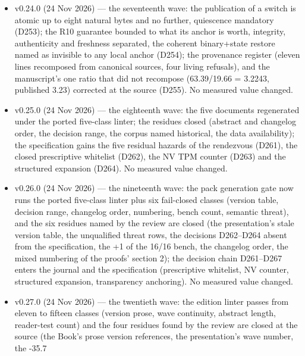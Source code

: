 \documentclass[10pt,a4paper]{article}
\begin{document}
\begin{itemize}
\item v0.24.0 (24 Nov 2026) --- the seventeenth wave: the publication of a switch is atomic up to eight natural bytes and no further, quiescence mandatory (D253); the R10 guarantee bounded to what its anchor is worth, integrity, authenticity and freshness separated, the coherent binary+state restore named as invisible to any local anchor (D254); the provenance register (eleven lines recomposed from canonical sources, four living refusals), and the manuscript's one ratio that did not recompose (63.39/19.66 = 3.2243, published 3.23) corrected at the source (D255). No measured value changed.
\item v0.25.0 (24 Nov 2026) --- the eighteenth wave: the five documents regenerated under the ported five-class linter; the residues closed (abstract and changelog order, the decision range, the corpus named historical, the data availability); the specification gains the five residual hazards of the rendezvous (D261), the closed prescriptive whitelist (D262), the NV TPM counter (D263) and the structured expansion (D264). No measured value changed.
\item v0.26.0 (24 Nov 2026) --- the nineteenth wave: the pack generation gate now runs the ported five-class linter plus six fail-closed classes (version table, decision range, changelog order, numbering, bench count, semantic threat), and the six residues named by the review are closed (the presentation's stale version table, the unqualified threat rows, the decisions D262--D264 absent from the specification, the +1 of the 16/16 bench, the changelog order, the mixed numbering of the proofs' section 2); the decision chain D261--D267 enters the journal and the specification (prescriptive whitelist, NV counter, structured expansion, transparency anchoring). No measured value changed.
\item v0.27.0 (24 Nov 2026) --- the twentieth wave: the edition linter passes from eleven to fifteen classes (version prose, wave continuity, abstract length, reader-test count) and the four residues found by the review are closed at the source (the Book's prose version references, the presentation's wave number, the -35.7%

\end{itemize}
\end{document}
